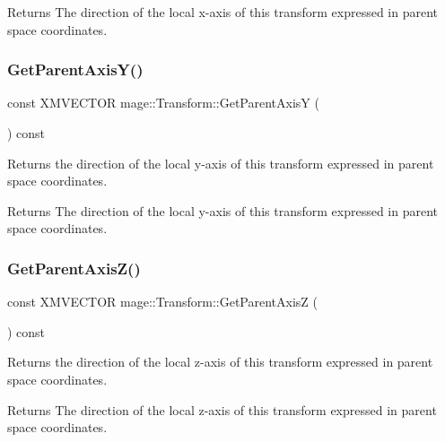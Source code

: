 \begin{DoxyReturn}{Returns}
The direction of the local x-\/axis of this transform expressed in parent space coordinates. 
\end{DoxyReturn}
\hypertarget{structmage_1_1_transform_a594483a22316fa35cac46e6e4d10ec3b}{}\label{structmage_1_1_transform_a594483a22316fa35cac46e6e4d10ec3b} 
\subsubsection{\texorpdfstring{Get\+Parent\+Axis\+Y()}{GetParentAxisY()}}
{\footnotesize\ttfamily const X\+M\+V\+E\+C\+T\+OR mage\+::\+Transform\+::\+Get\+Parent\+AxisY (\begin{DoxyParamCaption}{ }\end{DoxyParamCaption}) const\hspace{0.3cm}{\ttfamily [noexcept]}}

Returns the direction of the local y-\/axis of this transform expressed in parent space coordinates.

\begin{DoxyReturn}{Returns}
The direction of the local y-\/axis of this transform expressed in parent space coordinates. 
\end{DoxyReturn}
\hypertarget{structmage_1_1_transform_a1661099c0f983c32c1145f970d039d0b}{}\label{structmage_1_1_transform_a1661099c0f983c32c1145f970d039d0b} 
\subsubsection{\texorpdfstring{Get\+Parent\+Axis\+Z()}{GetParentAxisZ()}}
{\footnotesize\ttfamily const X\+M\+V\+E\+C\+T\+OR mage\+::\+Transform\+::\+Get\+Parent\+AxisZ (\begin{DoxyParamCaption}{ }\end{DoxyParamCaption}) const\hspace{0.3cm}{\ttfamily [noexcept]}}

Returns the direction of the local z-\/axis of this transform expressed in parent space coordinates.

\begin{DoxyReturn}{Returns}
The direction of the local z-\/axis of this transform expressed in parent space coordinates. 
\end{DoxyReturn}
\hypertarget{structmage_1_1_transform_a45b460585620b4b3e9ae20437ba1ef71}{}\label{structmage_1_1_transform_a45b460585620b4b3e9ae20437ba1ef71} 
